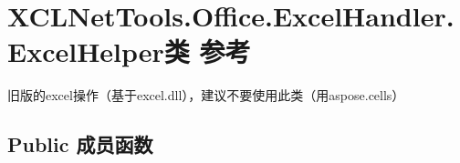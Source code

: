 \hypertarget{class_x_c_l_net_tools_1_1_office_1_1_excel_handler_1_1_excel_helper}{}\section{X\+C\+L\+Net\+Tools.\+Office.\+Excel\+Handler.\+Excel\+Helper类 参考}
\label{class_x_c_l_net_tools_1_1_office_1_1_excel_handler_1_1_excel_helper}


旧版的excel操作（基于excel.\+dll），建议不要使用此类（用aspose.\+cells）  


\subsection*{Public 成员函数}
